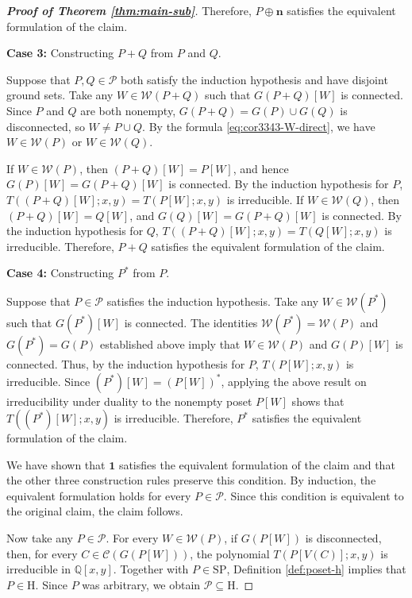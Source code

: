 \documentclass[10pt,a4paper]{amsart}
\begin{document}
\begin{proof}[\rm\textbf{Proof of Theorem \ref{thm:main-sub}}]
Therefore, $P\oplus\mathbf n$ satisfies
the equivalent formulation of the claim.

\textbf{Case 3:} Constructing $P+Q$ from $P$ and $Q$.

Suppose that $P,Q\in\mathcal P$ both satisfy the induction hypothesis
and have disjoint ground sets.
Take any $W\in\mathcal W(P+Q)$ such that
$G(P+Q)[W]$ is connected.
Since $P$ and $Q$ are both nonempty,
$G(P+Q)=G(P)\cup G(Q)$ is disconnected,
so $W\neq P\cup Q$.
By the formula \eqref{eq:cor3343-W-direct},
we have $W\in\mathcal W(P)$ or $W\in\mathcal W(Q)$.

If $W\in\mathcal W(P)$, then $(P+Q)[W]=P[W]$,
and hence $G(P)[W]=G(P+Q)[W]$ is connected.
By the induction hypothesis for $P$,
$T((P+Q)[W];x,y)=T(P[W];x,y)$ is irreducible.
If $W\in\mathcal W(Q)$, then $(P+Q)[W]=Q[W]$,
and $G(Q)[W]=G(P+Q)[W]$ is connected.
By the induction hypothesis for $Q$,
$T((P+Q)[W];x,y)=T(Q[W];x,y)$ is irreducible.
Therefore, $P+Q$ satisfies the equivalent formulation of the claim.

\textbf{Case 4:} Constructing $P^*$ from $P$.

Suppose that $P\in\mathcal P$ satisfies the induction hypothesis.
Take any $W\in\mathcal W(P^*)$ such that $G(P^*)[W]$ is connected.
The identities $\mathcal W(P^*)=\mathcal W(P)$
and $G(P^*)=G(P)$ established above imply that
$W\in\mathcal W(P)$ and $G(P)[W]$ is connected.
Thus, by the induction hypothesis for $P$,
$T(P[W];x,y)$ is irreducible.
Since $(P^*)[W]=(P[W])^*$,
applying the above result on irreducibility under duality
to the nonempty poset $P[W]$ shows that
$T((P^*)[W];x,y)$ is irreducible.
Therefore, $P^*$ satisfies the equivalent formulation of the claim.

We have shown that $\mathbf1$ satisfies
the equivalent formulation of the claim
and that the other three construction rules preserve this condition.
By induction, the equivalent formulation holds
for every $P\in\mathcal P$.
Since this condition is equivalent to the original claim,
the claim follows.

Now take any $P\in\mathcal P$.
For every $W\in\mathcal W(P)$, if $G(P[W])$ is disconnected,
then, for every $C\in\mathcal C(G(P[W]))$,
the polynomial $T(P[V(C)];x,y)$
is irreducible in $\mathbb Q[x,y]$.
Together with $P\in\mathrm{SP}$,
Definition \ref{def:poset-h} implies that $P\in\mathrm H$.
Since $P$ was arbitrary, we obtain $\mathcal P\subseteq\mathrm H$.
\end{proof}
\end{document}
